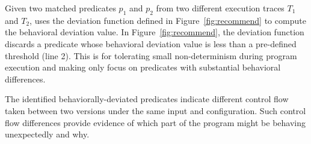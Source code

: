 Given two matched predicates $p_{1}$ and $p_{2}$ from two different execution traces $T_{1}$ and $T_{2}$,
\ourtool uses the {deviation} function defined in Figure~\ref{fig:recommend}
to compute the behavioral deviation value.
In Figure~\ref{fig:recommend}, the {deviation} function
 discards a predicate whose behavioral deviation value is less than
a pre-defined threshold (line 2). This is for tolerating small non-determinism
during program execution and
making \ourtool only focus on predicates with substantial
behavioral differences.

The identified behaviorally-deviated predicates indicate different
control flow taken between two versions under the same input
and configuration. Such control flow differences provide evidence of
which part of the program might be behaving unexpectedly and why.





